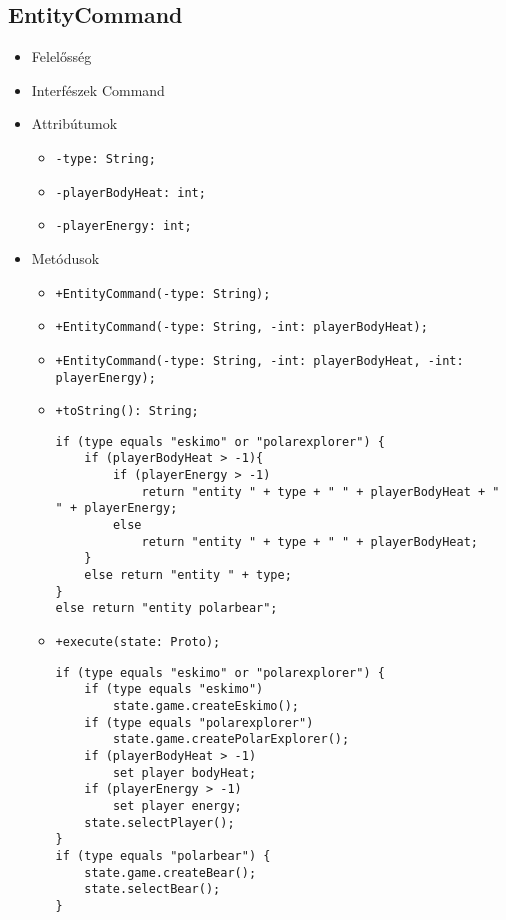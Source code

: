 \subsection{EntityCommand}
\begin{itemize}
\item Felelősség\newline
\item Interfészek\newline
Command
\item Attribútumok
	\begin{itemize}
	\item \texttt{-type: String;}
	\item \texttt{-playerBodyHeat: int;}
	\item \texttt{-playerEnergy: int;}	
	\end{itemize}
\item Metódusok
\begin{itemize}
		\item \texttt{+EntityCommand(-type: String);}
		\item \texttt{+EntityCommand(-type: String, -int: playerBodyHeat);}
		\item \texttt{+EntityCommand(-type: String, -int: playerBodyHeat, -int: playerEnergy);} 
		\item \texttt{+toString(): String;}
		\begin{lstlisting}
if (type equals "eskimo" or "polarexplorer") {
	if (playerBodyHeat > -1){
		if (playerEnergy > -1)
			return "entity " + type + " " + playerBodyHeat + " " + playerEnergy;					
		else
			return "entity " + type + " " + playerBodyHeat;
	}
	else return "entity " + type;			
}
else return "entity polarbear";
		\end{lstlisting}
		\item \texttt{+execute(state: Proto);}
		\begin{lstlisting}
if (type equals "eskimo" or "polarexplorer") {
	if (type equals "eskimo") 
		state.game.createEskimo();
	if (type equals "polarexplorer") 
		state.game.createPolarExplorer();
	if (playerBodyHeat > -1)
		set player bodyHeat;
	if (playerEnergy > -1)
		set player energy;			
	state.selectPlayer();
}
if (type equals "polarbear") {
	state.game.createBear();
	state.selectBear();
}
		\end{lstlisting}
	\end{itemize}
\end{itemize}
